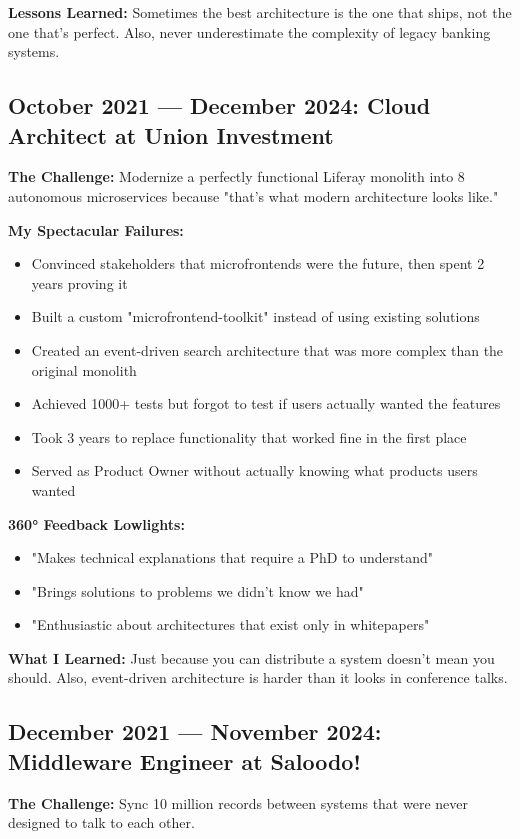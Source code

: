 \documentclass[10pt,a4paper]{article}
\begin{document}
\textbf{Lessons Learned:} Sometimes the best architecture is the one that ships, not the one that's perfect. Also, never underestimate the complexity of legacy banking systems.

\subsection*{October 2021 — December 2024: Cloud Architect at Union Investment}
\textbf{The Challenge:} Modernize a perfectly functional Liferay monolith into 8 autonomous microservices because "that's what modern architecture looks like."

\textbf{My Spectacular Failures:}
\begin{itemize}[leftmargin=1em,topsep=0pt,itemsep=0pt]
\item Convinced stakeholders that microfrontends were the future, then spent 2 years proving it
\item Built a custom "microfrontend-toolkit" instead of using existing solutions
\item Created an event-driven search architecture that was more complex than the original monolith
\item Achieved 1000+ tests but forgot to test if users actually wanted the features
\item Took 3 years to replace functionality that worked fine in the first place
\item Served as Product Owner without actually knowing what products users wanted
\end{itemize}

\textbf{360° Feedback Lowlights:}
\begin{itemize}[leftmargin=1em,topsep=0pt,itemsep=0pt]
\item "Makes technical explanations that require a PhD to understand"
\item "Brings solutions to problems we didn't know we had"
\item "Enthusiastic about architectures that exist only in whitepapers"
\end{itemize}

\textbf{What I Learned:} Just because you can distribute a system doesn't mean you should. Also, event-driven architecture is harder than it looks in conference talks.

\subsection*{December 2021 — November 2024: Middleware Engineer at Saloodo!}
\textbf{The Challenge:} Sync 10 million records between systems that were never designed to talk to each other.
\end{document}
